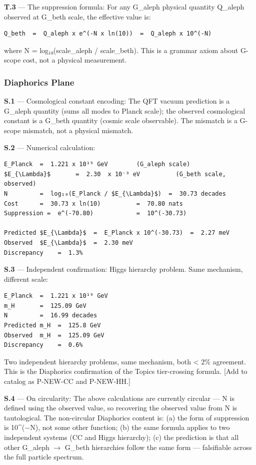 \documentclass[11pt,a4paper]{article}
\begin{document}
\textbf{T.3} --- The suppression formula: For any G\_aleph physical quantity Q\_aleph observed at G\_beth scale, the effective value is:

\begin{lstlisting}
Q_beth  =  Q_aleph x e^(-N x ln(10))  =  Q_aleph x 10^(-N)
\end{lstlisting}

where N = log₁₀(scale\_aleph / scale\_beth). This is a grammar axiom about G-scope cost, not a physical measurement.

\subsubsection{Diaphorics Plane}

\textbf{S.1} --- Cosmological constant encoding: The QFT vacuum prediction is a G\_aleph quantity (sums all modes to Planck scale); the observed cosmological constant is a G\_beth quantity (cosmic scale observable). The mismatch is a G-scope mismatch, not a physical mismatch.

\textbf{S.2} --- Numerical calculation:

\begin{lstlisting}
E_Planck  =  1.221 x 10¹⁹ GeV        (G_aleph scale)
$E_{\Lambda}$       =  2.30  x 10⁻³ eV          (G_beth scale, observed)
N         =  log₁₀(E_Planck / $E_{\Lambda}$)  =  30.73 decades
Cost      =  30.73 x ln(10)          =  70.80 nats
Suppression =  e^(-70.80)            =  10^(-30.73)

Predicted $E_{\Lambda}$  =  E_Planck x 10^(-30.73)  =  2.27 meV
Observed  $E_{\Lambda}$  =  2.30 meV
Discrepancy    =  1.3%
\end{lstlisting}

\textbf{S.3} --- Independent confirmation: Higgs hierarchy problem. Same mechanism, different scale:

\begin{lstlisting}
E_Planck  =  1.221 x 10¹⁹ GeV
m_H       =  125.09 GeV
N         =  16.99 decades
Predicted m_H  =  125.8 GeV
Observed  m_H  =  125.09 GeV
Discrepancy    =  0.6%
\end{lstlisting}

Two independent hierarchy problems, same mechanism, both \textless{} 2\% agreement. This is the Diaphorics confirmation of the Topics tier-crossing formula. {[}Add to catalog as P-NEW-CC and P-NEW-HH.{]}

\textbf{S.4} --- On circularity: The above calculations are currently circular --- N is defined using the observed value, so recovering the observed value from N is tautological. The non-circular Diaphorics content is: (a) the form of suppression is 10\^{}($-$N), not some other function; (b) the same formula applies to two independent systems (CC and Higgs hierarchy); (c) the prediction is that all other G\_aleph $\to$ G\_beth hierarchies follow the same form --- falsifiable across the full particle spectrum.
\end{document}
